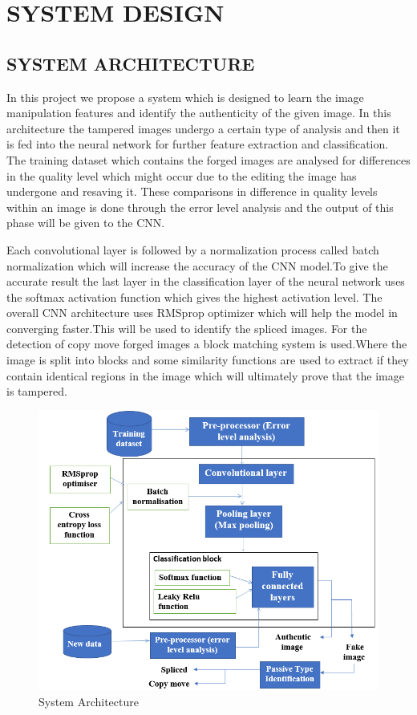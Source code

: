 
\chapter{SYSTEM DESIGN} %

\section{SYSTEM ARCHITECTURE}

\tab In this project we propose a system which is designed to learn the image manipulation features and identify the authenticity of the given image. In this architecture the tampered images undergo a certain type of analysis and then it is fed into the neural network for further feature extraction and classification. The training dataset which contains the forged images are analysed for differences in the quality level which might occur due to the editing the image has undergone and resaving it. These comparisons in difference in quality levels within an image is done through the error level analysis and the output of this phase will be given to the CNN.

\tab Each convolutional layer is followed by a normalization process called batch normalization which will increase the accuracy of the CNN model.To give the accurate result the last layer in the classification layer of the neural network uses the softmax activation function which gives the highest activation level. The overall CNN architecture uses RMSprop optimizer which will help the model in converging faster.This will be used to identify the spliced images.
\tab For the detection of copy move forged images a block matching system is used.Where the image is split into blocks and some similarity functions are used to extract if they contain identical regions in the image which will ultimately prove that the image is tampered.
\newpage
\begin{figure}[htp]
\centering
\includegraphics[scale=0.5,width=17cm]{Figures/ARC.PNG}
\caption{System Architecture}
\label{fig:universe}
\end{figure}
\newpage

